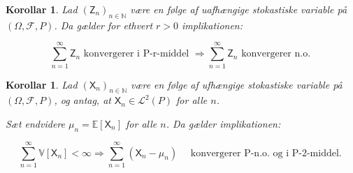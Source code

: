 \documentclass{article}
\newcommand{\1}{\mathbbm{1}}
\newcommand{\X}{\mathsf{X}}
\theoremstyle{boxed}
\newtheorem{corollary}[theorem]{Korollar}
\begin{document}
\begin{theorem-box}
    \begin{corollary}
        Lad $\left(\mathsf{Z}_n\right)_{n \in \mathbb{N}}$ være en følge af uafhængige stokastiske variable på $(\Omega, \mathcal{F}, P)$.
Da gælder for ethvert $r>0$ implikationen:

$$
\sum_{n=1}^{\infty} \mathsf{Z}_n \text { konvergerer i P-r-middel } \Longrightarrow \sum_{n=1}^{\infty} \mathsf{Z}_n \text { konvergerer n.o. }
$$

    \end{corollary}
\end{theorem-box}
\begin{theorem-box}
    \begin{corollary}
        Lad $\left(\mathsf{X}_n\right)_{n \in \mathbb{N}}$ være en følge af ufhængige stokastiske variable på $(\Omega, \mathcal{F}, P)$, og antag, at $\mathsf{X}_n \in \mathcal{L}^2(P)$ for alle $n$.

Sæt endvidere $\mu_n=\mathbb{E}\left[\mathsf{X}_n\right]$ for alle $n$.
Da gælder implikationen:

$$
\sum_{n=1}^{\infty} \mathbb{V}\left[\mathsf{X}_n\right]<\infty \Longrightarrow \sum_{n=1}^{\infty}\left(\X_n-\mu_n\right) \quad \text { konvergerer P-n.o. og i P-2-middel. }
$$

    \end{corollary}
\end{theorem-box}
\end{document}
